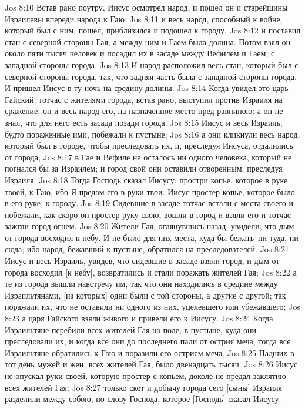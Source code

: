 Jos 8:10  Встав рано поутру, Иисус осмотрел народ, и пошел он и старейшины Израилевы впереди народа к Гаю;
Jos 8:11  и весь народ, способный к войне, который был с ним, пошел, приблизился и подошел к городу,
Jos 8:12  и поставил стан с северной стороны Гая, а между ним и Гаем была долина. Потом взял он около пяти тысяч человек и посадил их в засаде между Вефилем и Гаем, с западной стороны города.
Jos 8:13  И народ расположил весь стан, который был с северной стороны города, так, что задняя часть была с западной стороны города. И пришел Иисус в ту ночь на средину долины.
Jos 8:14  Когда увидел это царь Гайский, тотчас с жителями города, встав рано, выступил против Израиля на сражение, он и весь народ его, на назначенное место пред равниною; а он не знал, что для него есть засада позади города.
Jos 8:15  Иисус и весь Израиль, будто пораженные ими, побежали к пустыне;
Jos 8:16  а они кликнули весь народ, который был в городе, чтобы преследовать их, и, преследуя Иисуса, отдалились от города;
Jos 8:17  в Гае и Вефиле не осталось ни одного человека, который не погнался бы за Израилем; и город свой они оставили отворенным, преследуя Израиля.
Jos 8:18  Тогда Господь сказал Иисусу: простри копье, которое в руке твоей, к Гаю, ибо Я предам его в руки твои. Иисус простер копье, которое было в его руке, к городу.
Jos 8:19  Сидевшие в засаде тотчас встали с места своего и побежали, как скоро он простер руку свою, вошли в город и взяли его и тотчас зажгли город огнем.
Jos 8:20  Жители Гая, оглянувшись назад, увидели, что дым от города восходил к небу. И не было для них места, куда бы бежать--ни туда, ни сюда; ибо народ, бежавший к пустыне, обратился на преследователей.
Jos 8:21  Иисус и весь Израиль, увидев, что сидевшие в засаде взяли город, и дым от города восходил [к небу], возвратились и стали поражать жителей Гая;
Jos 8:22  а те из города вышли навстречу им, так что они находились в средине между Израильтянами, [из которых] одни были с той стороны, а другие с другой; так поражали их, что не оставили ни одного из них, уцелевшего или убежавшего;
Jos 8:23  а царя Гайского взяли живого и привели его к Иисусу.
Jos 8:24  Когда Израильтяне перебили всех жителей Гая на поле, в пустыне, куда они преследовали их, и когда все они до последнего пали от острия меча, тогда все Израильтяне обратились к Гаю и поразили его острием меча.
Jos 8:25  Падших в тот день мужей и жен, всех жителей Гая, было двенадцать тысяч.
Jos 8:26  Иисус не опускал руки своей, которую простер с копьем, доколе не предал заклятию всех жителей Гая;
Jos 8:27  только скот и добычу города сего [сыны] Израиля разделили между собою, по слову Господа, которое [Господь] сказал Иисусу.
